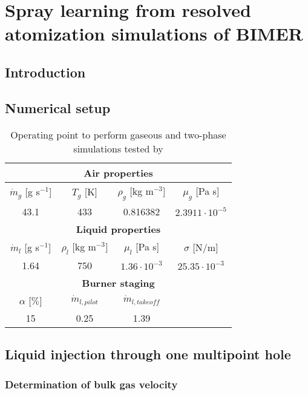 \chapter{Spray learning from resolved atomization simulations of BIMER}
	\label{ch8:bimer_resolved_atomization}

\section{Introduction}

\section{Numerical setup}

\begin{table}[!h]
\centering
\caption{Operating point to perform gaseous and two-phase simulations tested by }
\begin{tabular}{|c|c|c|c|}
\hline
\multicolumn{4}{|c|}{\textbf{Air properties}} \\
\hline
$\dot{m}_g$ [g s$^{-1}$] & $T_g$ [K] & $\rho_g$ [kg m$^{-3}$]  & $\mu_g$ [Pa s]  \\
\hline
43.1 & 433 & 0.816382 & $2.3911 \cdot 10^{-5}$ \\
\hline
\hline
\multicolumn{4}{|c|}{\textbf{Liquid properties}} \\
\hline
$\dot{m}_l$ [g s$^{-1}$] & $\rho_l$ [kg m$^{-3}]$   & $\mu_l$ [Pa s]   & $\sigma$ [N/m]   \\
\hline
1.64 & 750 & $1.36 \cdot 10^{-3}$ & $25.35 \cdot 10^{-3}$ \\
\hline
\hline
\multicolumn{4}{|c|}{\textbf{Burner staging}} \\
\hline
$\alpha$ [$\%$] & $\dot{m}_{l,pilot}$ & $\dot{m}_{l,takeoff}$ & \\
\hline
15 & 0.25 & 1.39 & \\
\hline
\end{tabular}
\label{tab:liquid_operating_point_Renaud}
\end{table}


\section{Liquid injection through one multipoint hole}

\subsection{Determination of bulk gas velocity}

